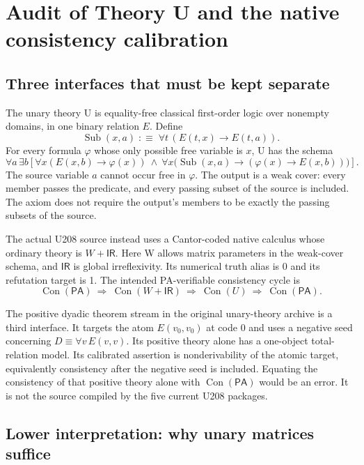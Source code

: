\documentclass[11pt,a4paper]{article}
\newcommand{\PA}{\mathsf{PA}}
\newcommand{\Con}{\operatorname{Con}}
\newcommand{\Sub}{\operatorname{Sub}}
\newcommand{\IR}{\mathsf{IR}}
\begin{document}
\section{Audit of Theory U and the native consistency calibration}

\subsection{Three interfaces that must be kept separate}

The unary theory U is equality-free classical first-order logic over
nonempty domains, in one binary relation $E$. Define
\[
\Sub(x,a)\;:\!\equiv\;\forall t\,(E(t,x)\to E(t,a)).
\]
For every formula $\varphi$ whose only possible free variable is $x$, U has
the schema
\begin{equation}\label{eq:U}
\forall a\,\exists b\left[
 \forall x(E(x,b)\to\varphi(x))\ \land\
 \forall x\bigl(\Sub(x,a)\to(\varphi(x)\to E(x,b))\bigr)
\right].
\end{equation}
The source variable $a$ cannot occur free in $\varphi$. The output is a
weak cover: every member passes the predicate, and every passing subset of
the source is included. The axiom does not require the output's members to
be exactly the passing subsets of the source.

The actual U208 source instead uses a Cantor-coded native calculus whose
ordinary theory is $W+\IR$. Here W allows matrix parameters in the weak-cover
schema, and $\IR$ is global irreflexivity. Its numerical truth alias is 0 and
its refutation target is 1. The intended PA-verifiable consistency cycle is
\begin{equation}\label{eq:cycle}
\Con(\PA)\ \Longrightarrow\ \Con(W+\IR)
\ \Longrightarrow\ \Con(U)\ \Longrightarrow\ \Con(\PA).
\end{equation}

The positive dyadic theorem stream in the original unary-theory archive is
a third interface. It targets the atom $E(v_0,v_0)$ at code 0 and uses a
negative seed concerning $D\equiv\forall v\,E(v,v)$. Its positive theory
alone has a one-object total-relation model. Its calibrated assertion is
nonderivability of the atomic target, equivalently consistency after the
negative seed is included. Equating the consistency of that positive theory
alone with $\Con(\PA)$ would be an error. It is not the source compiled by
the five current U208 packages.

\subsection{Lower interpretation: why unary matrices suffice}
\end{document}
